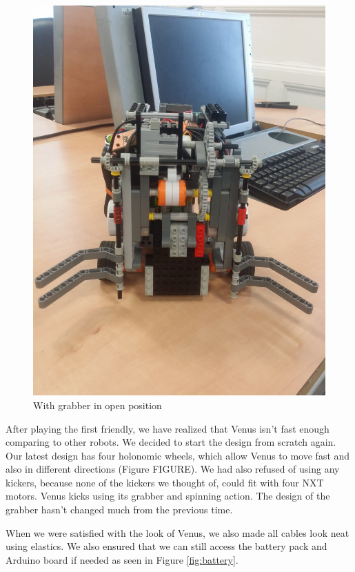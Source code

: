 \documentclass[a4paper,12pt]{article}
\begin{document}
\begin{figure}[ht]
\begin{minipage}[b]{.48\textwidth}
		\includegraphics[scale=0.065, angle=-90]{grab_open.jpg}
		\caption{With grabber in open position}
		\label{fig:open}
	\end{minipage}
\end{figure}

After playing the first friendly, we have realized that Venus isn't fast enough comparing to other robots. We decided to start the design from scratch again. Our latest design has four holonomic wheels, which allow Venus to move fast and also in different directions (Figure FIGURE). We had also refused of using any kickers, because none of the kickers we thought of, could fit with four NXT motors. Venus kicks using its grabber and spinning action. The design of the grabber hasn't changed much from the previous time. 

When we were satisfied with the look of Venus, we also made all cables look neat using elastics. We also ensured that we can still access the battery pack and Arduino board if needed as seen in Figure \ref{fig:battery}.
\end{document}
